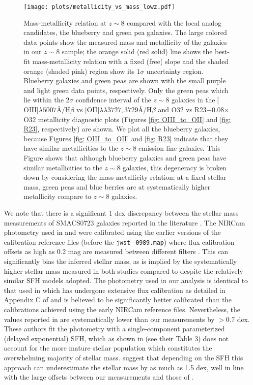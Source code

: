 \documentclass[twocolumn]{aastex631}
\begin{document}
\begin{figure*}
    \centering
    \texttt{[image: plots/metallicity\_vs\_mass\_lowz.pdf]}
    \caption{Mass-metallicity relation at $z \sim 8$ compared with the local analog candidates, the blueberry and green pea galaxies. The large colored data points show the measured mass and metallicity of the galaxies in our $z \sim 8$ sample; the orange solid (red solid) line shows the best-fit mass-metallicity relation with a fixed (free) slope and the shaded orange (shaded pink) region show its $1\sigma$ uncertainty region. Blueberry galaxies and green peas are shown with the small purple and light green data points, respectively. Only the green peas which lie within the $2\sigma$ confidence interval of the $z \sim 8$ galaxies in the $[$O{\footnotesize\;III}$]\lambda 5007$\AA/H$\beta$ vs $[$O{\footnotesize\;II}$]\lambda \lambda 3727, 3729$\AA/H$\beta$ and O32 vs R23$-$0.08$\times$O32 metallicity diagnostic plots (Figures \ref{fig: OIII_to_OII} and \ref{fig: R23}, respectively) are shown. We plot all the blueberry galaxies, because Figures \ref{fig: OIII_to_OII} and \ref{fig: R23} indicate that they have similar metallicities to the $z \sim 8$ emission line galaxies. This Figure shows that although blueberry galaxies and green peas have similar metallicities to the $z \sim 8$ galaxies, this degeneracy is broken down by considering the mass-metallicity relation; at a fixed stellar mass, green peas and blue berries are at systematically higher metallicity compare to $z \sim 8$ galaxies.}
    \label{fig: MZ lowz}
\end{figure*}

We note that there is a significant 1 dex discrepancy between the stellar mass measurements of SMACS0723 galaxies reported in the literature \citep[see, e.g.,][]{curti+2022, schaerer+2022, carnall+2022}. The NIRCam photometry used in \cite{curti+2022} and \cite{schaerer+2022} were calibrated using the earlier versions of the calibration reference files (before the \texttt{jwst$-$0989.map}) where flux calibration offsets as high as 0.2 mag are measured between different filters \citep[see, e.g.,][]{2022RNAAS...6..191B}. This can significantly bias the inferred stellar mass, as is implied by the systematically higher stellar mass measured in both studies compared to \cite{carnall+2022} despite the relatively similar SFH models adopted. The photometry used in our analysis is identical to that used in \cite{carnall+2022} which has undergone extensive flux calibration as detailed in Appendix C of \cite{donnan+2022} and is believed to be significantly better calibrated than the calibrations achieved using the early NIRCam reference files. Nevertheless, the values reported in \cite{carnall+2022} are systematically lower than our measurements by $> 0.7$ dex. These authors fit the photometry with a single-component parameterized (delayed exponential) SFH, which as shown in \cite{rb2020} (see their Table 3) does not account for the more mature stellar population which constitutes the overwhelming majority of stellar mass. \cite{rb2020} suggest that depending on the SFH this approach can underestimate the stellar mass by as much as 1.5 dex, well in line with the large offsets between our measurements and those of \cite{carnall+2022}. 
\end{document}
